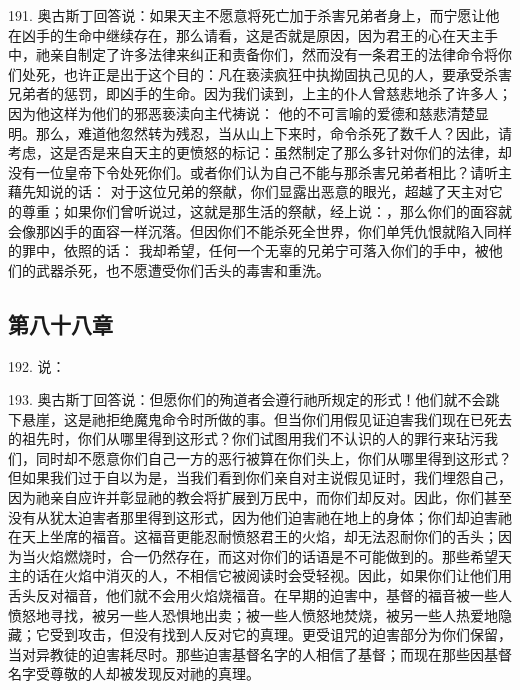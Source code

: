 191. 奥古斯丁回答说：如果天主不愿意将死亡加于杀害兄弟者身上，而宁愿让他在凶手的生命中继续存在，那么请看，这是否就是原因，因为君王的心在天主手中，祂亲自制定了许多法律来纠正和责备你们，然而没有一条君王的法律命令将你们处死，也许正是出于这个目的：凡在亵渎疯狂中执拗固执己见的人，要承受杀害兄弟者的惩罚，即凶手的生命。因为我们读到，上主的仆人曾慈悲地杀了许多人；因为他这样为他们的邪恶亵渎向主代祷说： 他的不可言喻的爱德和慈悲清楚显明。那么，难道他忽然转为残忍，当从山上下来时，命令杀死了数千人？因此，请考虑，这是否是来自天主的更愤怒的标记：虽然制定了那么多针对你们的法律，却没有一位皇帝下令处死你们。或者你们认为自己不能与那杀害兄弟者相比？请听主藉先知说的话： 对于这位兄弟的祭献，你们显露出恶意的眼光，超越了天主对它的尊重；如果你们曾听说过，这就是那生活的祭献，经上说：，那么你们的面容就会像那凶手的面容一样沉落。但因你们不能杀死全世界，你们单凭仇恨就陷入同样的罪中，依照的话： 我却希望，任何一个无辜的兄弟宁可落入你们的手中，被他们的武器杀死，也不愿遭受你们舌头的毒害和重洗。\par


\subsection{第八十八章}

192. 说：\par

193. 奥古斯丁回答说：但愿你们的殉道者会遵行祂所规定的形式！他们就不会跳下悬崖，这是祂拒绝魔鬼命令时所做的事。但当你们用假见证迫害我们现在已死去的祖先时，你们从哪里得到这形式？你们试图用我们不认识的人的罪行来玷污我们，同时却不愿意你们自己一方的恶行被算在你们头上，你们从哪里得到这形式？但如果我们过于自以为是，当我们看到你们亲自对主说假见证时，我们埋怨自己，因为祂亲自应许并彰显祂的教会将扩展到万民中，而你们却反对。因此，你们甚至没有从犹太迫害者那里得到这形式，因为他们迫害祂在地上的身体；你们却迫害祂在天上坐席的福音。这福音更能忍耐愤怒君王的火焰，却无法忍耐你们的舌头；因为当火焰燃烧时，合一仍然存在，而这对你们的话语是不可能做到的。那些希望天主的话在火焰中消灭的人，不相信它被阅读时会受轻视。因此，如果你们让他们用舌头反对福音，他们就不会用火焰烧福音。在早期的迫害中，基督的福音被一些人愤怒地寻找，被另一些人恐惧地出卖；被一些人愤怒地焚烧，被另一些人热爱地隐藏；它受到攻击，但没有找到人反对它的真理。更受诅咒的迫害部分为你们保留，当对异教徒的迫害耗尽时。那些迫害基督名字的人相信了基督；而现在那些因基督名字受尊敬的人却被发现反对祂的真理。\par

